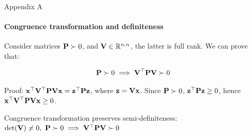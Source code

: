\documentclass{beamer}
\begin{document}
	
	
\myqrframe
	
	
	
	
	\begin{frame}{Appendix A}
		\framesubtitle{Congruence transformation and definiteness}
		\begin{flushleft}
			
			Consider matrices $\mathbf{P} \succ 0$, and $\mathbf{V} \in \mathbb{R}^{n, n}$, the latter is full rank. We can prove that:
			
			\begin{equation}
				\mathbf{P} \succ 0 \implies \mathbf{V}^\top\mathbf{P}\mathbf{V} \succ 0
			\end{equation}
			
			Proof: $\mathbf{x}^\top\mathbf{V}^\top\mathbf{P}\mathbf{V}\mathbf{x} = \mathbf{z}^\top\mathbf{P}\mathbf{z}$, where $\mathbf{z} = \mathbf{V}\mathbf{x}$. Since $\mathbf{P} \succ 0$, $\mathbf{z}^\top\mathbf{P}\mathbf{z} \geq 0$, hence $\mathbf{x}^\top\mathbf{V}^\top\mathbf{P}\mathbf{V}\mathbf{x} \geq 0$. 
			
			\begin{definition}
				Congruence transformation preserves semi-definiteness: $\text{det}(\mathbf{V}) \neq 0, \ \mathbf{P} \succ 0 \implies \mathbf{V}^\top\mathbf{P}\mathbf{V} \succ 0$
			\end{definition}
			
			
		\end{flushleft}
	\end{frame}
	
	
	
	
\end{document}
